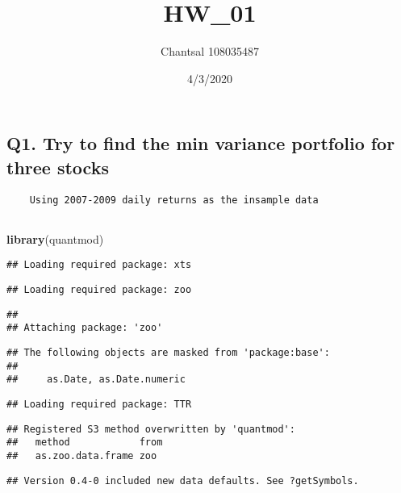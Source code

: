 \documentclass[]{article}
\title{HW\_01}
\author{Chantsal 108035487}
\date{4/3/2020}
\newenvironment{Shaded}{\begin{snugshade}}{\end{snugshade}}
\newcommand{\KeywordTok}[1]{\textcolor[rgb]{0.13,0.29,0.53}{\textbf{#1}}}
\newcommand{\NormalTok}[1]{#1}
\begin{document}
\maketitle

\hypertarget{q1.-try-to-find-the-min-variance-portfolio-for-three-stocks}{%
\subsection{Q1. Try to find the min variance portfolio for three
stocks}\label{q1.-try-to-find-the-min-variance-portfolio-for-three-stocks}}

\begin{verbatim}
    Using 2007-2009 daily returns as the insample data
    
\end{verbatim}

\begin{Shaded}
\begin{Highlighting}[]
\KeywordTok{library}\NormalTok{(quantmod)}
\end{Highlighting}
\end{Shaded}

\begin{verbatim}
## Loading required package: xts
\end{verbatim}

\begin{verbatim}
## Loading required package: zoo
\end{verbatim}

\begin{verbatim}
## 
## Attaching package: 'zoo'
\end{verbatim}

\begin{verbatim}
## The following objects are masked from 'package:base':
## 
##     as.Date, as.Date.numeric
\end{verbatim}

\begin{verbatim}
## Loading required package: TTR
\end{verbatim}

\begin{verbatim}
## Registered S3 method overwritten by 'quantmod':
##   method            from
##   as.zoo.data.frame zoo
\end{verbatim}

\begin{verbatim}
## Version 0.4-0 included new data defaults. See ?getSymbols.
\end{verbatim}
\end{document}
